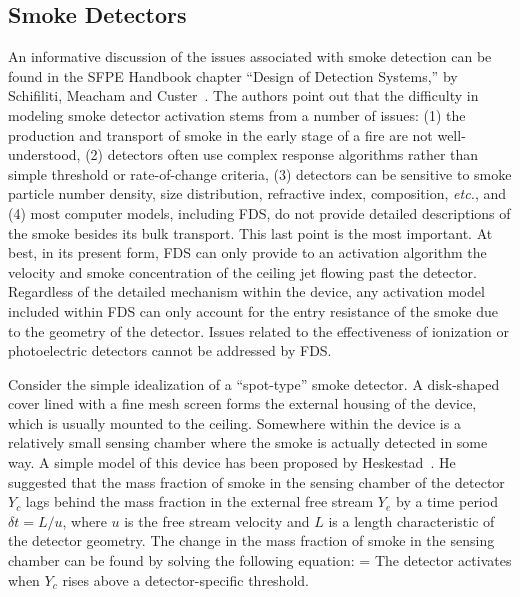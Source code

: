 \documentclass[11pt]{book}
\begin{document}
\subsection{Smoke Detectors}

An informative discussion of the issues associated with smoke detection can be found in the
SFPE Handbook chapter ``Design of Detection Systems,'' by Schifiliti, Meacham and Custer~\cite{SFPE}.
The authors point out that the difficulty in modeling smoke detector activation stems from a number of issues:
(1) the production and transport of smoke in the early stage of a fire are not well-understood, (2) detectors often use
complex response algorithms rather than simple threshold or rate-of-change criteria, (3) detectors can be sensitive
to smoke particle number density, size distribution, refractive index, composition, {\em etc.}, and (4) most
computer models, including FDS, do not provide detailed descriptions of the smoke besides its bulk transport. This
last point is the most important. At best, in its present form, FDS can only provide to an activation algorithm the
velocity and smoke concentration of the ceiling jet flowing past the detector. Regardless of the
detailed mechanism within
the device, any activation model included within FDS can only account for the entry resistance of the smoke due to the
geometry of the detector. Issues related to the effectiveness of ionization or photoelectric detectors cannot be
addressed by FDS.

Consider the simple idealization of a ``spot-type'' smoke detector. A disk-shaped cover lined with a fine mesh screen
forms the external housing of the device, which is usually mounted to the ceiling.
Somewhere within the device is a relatively small sensing chamber where the smoke is actually detected in some way.
A simple model of this device has been proposed by Heskestad~\cite{SFPE}. He suggested that the mass fraction of smoke in the
sensing chamber of the detector $Y_c$ lags behind the mass fraction in the
external free stream $Y_e$ by a time period $\delta t = L/u$,
where $u$ is the free stream velocity and $L$ is a length characteristic of the detector geometry.
The change in the mass fraction of smoke in the sensing chamber can be found by solving the following equation:
\be {} =  \label{HYoeq} \ee
The detector activates when $Y_c$ rises above a detector-specific threshold.
\end{document}
